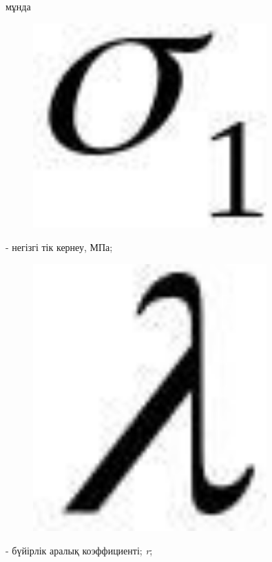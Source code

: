 мұнда \begin{figure}[H]
	\centering
	\includegraphics[width=0.8\textwidth]{assets/1276}
	\caption*{}
\end{figure} - негізгі тік кернеу, МПа;

\begin{figure}[H]
	\centering
	\includegraphics[width=0.8\textwidth]{assets/1277}
	\caption*{}
\end{figure} - бүйірлік аралық коэффициенті;
\emph{r};

